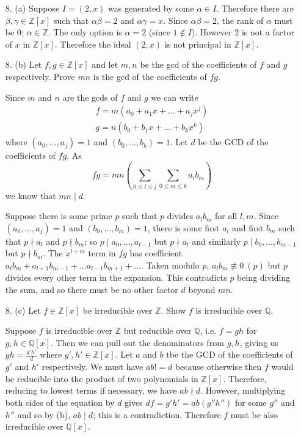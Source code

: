 \documentclass{article}
\newcommand{\Q}[0]{\mathbb{Q}}
\newcommand{\Z}[0]{\mathbb{Z}}
\newcommand{\modnotequiv}[3]{#1 \not\equiv #2\ (#3)}
\begin{document}
\begin{enumerate}
\item[8. (a)] Suppose $I = (2, x)$ was generated by some $\alpha \in I$.  Therefore there are $\beta, \gamma \in \Z[x]$ such that $\alpha\beta = 2$ and $\alpha\gamma = x$.  Since $\alpha\beta = 2$, the rank of $\alpha$ must be 0; $\alpha \in \Z$.  The only option is $\alpha = 2$ (since $1 \not\in I$).  However 2 is not a factor of $x$ in $\Z[x]$.  Therefore the ideal $(2, x)$ is not principal in $\Z[x]$.

\item[8. (b)] Let $f, g \in \Z[x]$ and let $m, n$ be the gcd of the coefficients of $f$ and $g$ respectively.  Prove $mn$ is the gcd of the coefficients of $fg$.

Since $m$ and $n$ are the gcds of $f$ and $g$ we can write \begin{gather}f = m(a_0 + a_1 x + \ldots + a_j x^j) \\ g = n(b_0 + b_1x + \ldots + b_k x^k)\end{gather} where $(a_0, \ldots, a_j) = 1$ and $(b_0, \ldots, b_k) = 1$.  Let $d$ be the GCD of the coefficients of $fg$.  As \[ fg = mn(\sum_{0 \le l \le j} \sum_{0 \le m \le k} a_l b_m ) \] we know that $mn \mid d$.

Suppose there is some prime $p$ such that $p$ divides $a_l b_m$ for all $l, m$.  Since $(a_0, \ldots, a_j) = 1$ and $(b_0, \ldots, b_m) = 1$, there is some first $a_l$ and first $b_m$ such that $p \nmid a_l$ and $p \nmid b_m$; so $p \mid a_0, \ldots, a_{l-1}$ but $p \nmid a_{l}$ and similarly $p \mid b_0, \ldots, b_{m-1}$ but $p \nmid b_{m}$.  The $x^{l + m}$ term in $fg$ has coefficient $a_l b_m + a_{l + 1} b_{m-1} + \ldots a_{l-1} b_{m+1} + \ldots$.  Taken modulo $p$, $\modnotequiv{a_l b_m}{0}{p}$ but $p$ divides every other term in the expansion.  This contradicts $p$ being dividing the sum, and so there must be no other factor $d$ beyond $mn$.

\item[8. (c)] Let $f \in \Z[x]$ be irreducible over $\Z$.  Show $f$ is irreducible over $\Q$.

Suppose $f$ is irreducible over $\Z$ but reducible over $\Q$, i.e. $f = gh$ for $g, h \in \Q[x]$.  Then we can pull out the denominators from $g, h$, giving us $gh = \frac{g'h'}{d}$ where $g', h' \in \Z[x]$.  Let $a$ and $b$ tbe the GCD of the coefficients of $g'$ and $h'$ respectively.  We must have $ab != d$ because otherwise then $f$ would be reducible into the product of two polynomials in $\Z[x]$.  Therefore, reducing to lowest terms if necessary, we have $ab \nmid d$.  However, multiplying both sides of the equation by $d$ gives $df = g'h' = ab(g'' h'')$ for some $g''$ and $h''$ and so by (b), $ab \mid d$; this is a contradiction.  Therefore $f$ must be also irreducible over $\Q[x]$.


\end{enumerate}
\end{document}
